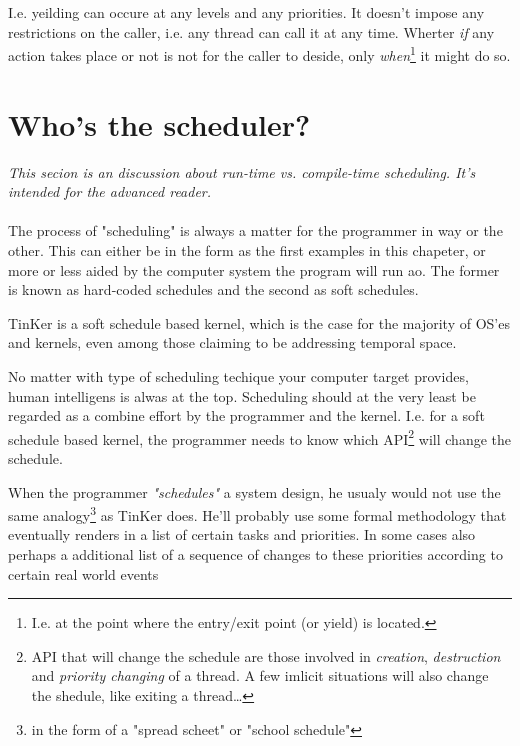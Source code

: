 	I.e. yeilding can occure at any levels and any priorities. It doesn't impose any restrictions on the caller, i.e. any thread can call it at any time. Wherter \textit{if} any action takes place or not is not for the caller to deside, only \textit{when}\footnote{I.e. at the point where the entry/exit point (or yield) is located.} it might do so.
	

\section{Who's the scheduler?}
\textit{This secion is an discussion about run-time vs. compile-time scheduling. It's intended for the advanced reader.}
\\\\
The process of "scheduling" is always a matter for the programmer in way or the other. This can either be in the form as the first examples in this chapeter, or more or less aided by the computer system the program will run ao. The former is known as hard-coded schedules and the second as soft schedules. 

TinKer is a soft schedule based kernel, which is the case for the majority of OS'es and kernels, even among those claiming to be addressing temporal space. 

No matter with type of scheduling techique your computer target provides, human intelligens is alwas at the top. Scheduling should at the very least be regarded as a combine effort by the programmer and the kernel. I.e. for a soft schedule based kernel, the programmer needs to know which API\footnote{API that will change the schedule are those involved in \textit{creation}, \textit{destruction} and \textit{priority changing} of a thread. A few imlicit situations will also change the shedule, like exiting a thread\ldots} will change the schedule.


When the programmer \textit{"schedules"} a system design, he usualy would not use the same analogy\footnote{in the form of a "spread scheet" or "school schedule"\textit{}} as TinKer does. He'll probably use some formal methodology that eventually renders in a list of certain tasks and priorities. In some cases also perhaps a additional list of a sequence of changes to these priorities according to certain real world events 

